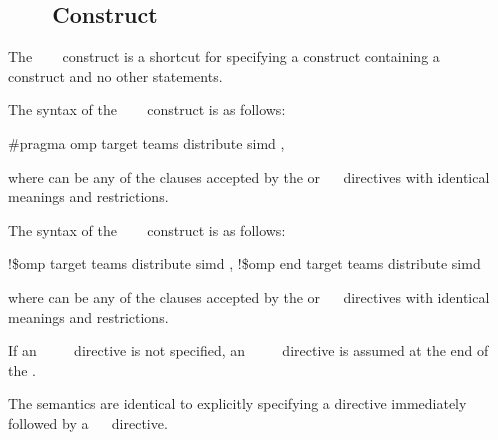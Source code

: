 {{{{\subsection{~~~ Construct}
\label{subsec:target teams distribute simd construct}
\summary
The ~~~ construct is a shortcut for specifying a  construct 
containing a ~~ construct and no other statements.

\syntax
\ccppspecificstart
The syntax of the ~~~ construct is as follows:

\begin{boxedcode}
\#pragma omp target teams distribute simd \plc{[clause[ [},\plc{] clause] ...  ] new-line}
\end{boxedcode}

where  can be any of the clauses accepted by the  or 
~~ directives with identical meanings and restrictions.
\ccppspecificend

\fortranspecificstart
The syntax of the ~~~ construct is as follows:

\begin{boxedcode}
!\$omp target teams distribute simd \plc{[clause[ [},\plc{] clause] ... ]}
\plc{[}!\$omp end target teams distribute simd\plc{]}
\end{boxedcode}

where  can be any of the clauses accepted by the  or 
~~ directives with identical meanings and restrictions.

If an ~~~~ directive is not specified, an 
~~~~ directive is assumed at the end of the .
\fortranspecificend

\descr
The semantics are identical to explicitly specifying a  directive immediately 
followed by a ~~ directive.

}}}}
